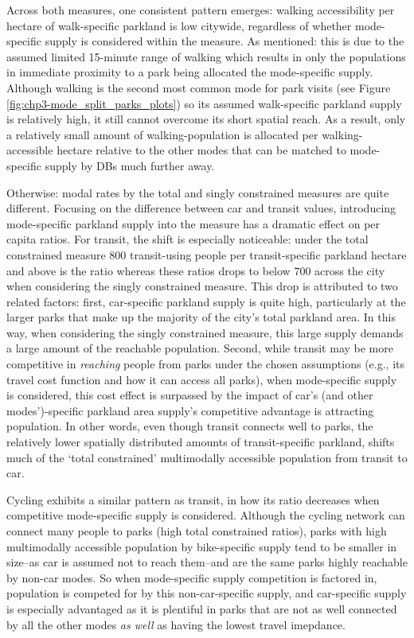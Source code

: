 \documentclass[
11pt, %
oneside, %
english, %
singlespacing, %
]{macthesis} %
\begin{document}
Across both measures, one consistent pattern emerges: walking accessibility per hectare of walk-specific parkland is low citywide, regardless of whether mode-specific supply is considered within the measure. As mentioned: this is due to the assumed limited 15-minute range of walking which results in only the populations in immediate proximity to a park being allocated the mode-specific supply. Although walking is the second most common mode for park visits (see Figure \ref{fig:chp3-mode_split_parks_plots}) so its assumed walk-specific parkland supply is relatively high, it still cannot overcome its short spatial reach. As a result, only a relatively small amount of walking-population is allocated per walking-accessible hectare relative to the other modes that can be matched to mode-specific supply by DBs much further away.

Otherwise: modal rates by the total and singly constrained measures are quite different. Focusing on the difference between car and transit values, introducing mode-specific parkland supply into the measure has a dramatic effect on per capita ratios. For transit, the shift is especially noticeable: under the total constrained measure 800 transit-using people per transit-specific parkland hectare and above is the ratio whereas these ratios drops to below 700 across the city when considering the singly constrained measure. This drop is attributed to two related factors: first, car-specific parkland supply is quite high, particularly at the larger parks that make up the majority of the city's total parkland area. In this way, when considering the singly constrained measure, this large supply demands a large amount of the reachable population. Second, while transit may be more competitive in \emph{reaching} people from parks under the chosen assumptions (e.g., its travel cost function and how it can access all parks), when mode-specific supply is considered, this cost effect is surpassed by the impact of car's (and other modes')-specific parkland area supply's competitive advantage is attracting population. In other words, even though transit connects well to parks, the relatively lower spatially distributed amounts of transit-specific parkland, shifts much of the `total constrained' multimodally accessible population from transit to car.

Cycling exhibits a similar pattern as transit, in how its ratio decreases when competitive mode-specific supply is considered. Although the cycling network can connect many people to parks (high total constrained ratios), parks with high multimodally accessible population by bike-specific supply tend to be smaller in size--as car is assumed not to reach them--and are the same parks highly reachable by non-car modes. So when mode-specific supply competition is factored in, population is competed for by this non-car-specific supply, and car-specific supply is especially advantaged as it is plentiful in parks that are not as well connected by all the other modes \emph{as well} as having the lowest travel imepdance.
\end{document}
